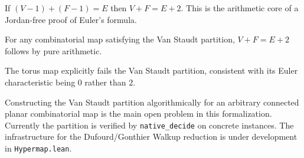 \begin{theorem}\label{thm:vanstaudt_arith}
\leanok
{}
If $(V-1) + (F-1) = E$ then $V + F = E + 2$.
This is the arithmetic core of a Jordan-free proof of Euler's formula.
\end{theorem}

\begin{theorem}\label{thm:euler_vanstaudt}
\leanok
{}
For any combinatorial map satisfying the Van Staudt partition,
$V + F = E + 2$ follows by pure arithmetic.
\end{theorem}

\begin{theorem}\label{thm:torus_fails}
\leanok
{}
The torus map explicitly fails the Van Staudt partition, consistent
with its Euler characteristic being $0$ rather than $2$.
\end{theorem}

\begin{remark}
Constructing the Van Staudt partition algorithmically for an arbitrary
connected planar combinatorial map is the main open problem in this
formalization. Currently the partition is verified by \texttt{native\_decide}
on concrete instances. The infrastructure for the Dufourd/Gonthier
Walkup reduction is under development in \texttt{Hypermap.lean}.
\end{remark}
